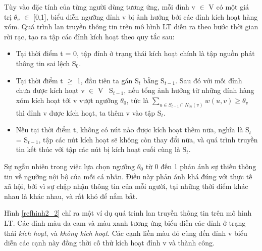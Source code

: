 	Tùy vào đặc tính của từng người dùng tương ứng, mỗi đỉnh v $\in$ V có một giá trị $\theta$$_{v}$ $\in$ [0,1], biểu diễn ngưỡng đỉnh v bị ảnh hưởng bởi các đỉnh kích hoạt hàng xóm. Quá trình lan truyền thông tin trên mô hình LT diễn ra theo bước thời gian rời rạc, tạo ra tập các đỉnh kích hoạt theo quy tắc sau:
	\begin {itemize}
		\item Tại thời điểm t = 0, tập đỉnh ở trạng thái kích hoạt chính là tập nguồn phát thông tin sai lệch S$_{0}$.
	
		\item Tại thời điểm t $\geq$ 1, đầu tiên ta gán S$_{t}$ bằng S$_{t-1}$. Sau đó với mỗi đỉnh chưa được kích hoạt v $\in$ V \ S$_{t-1}$, nếu tổng ảnh hưởng từ những đính hàng xóm kích hoạt tới v vượt ngưỡng $\theta$$_{0}$, tức là  $\sum_{u\in S_{t-1} \cap N_{in}(v)}w(u,v) \geq \theta_{v}$ thì đỉnh v được kích hoạt, ta thêm v vào tập S$_{t}$.
	
		\item Nếu tại thời điểm t, không có nút nào được kích hoạt thêm nữa, nghĩa là S$_{t}$ = S$_{t-1}$, tập các nút kích hoạt sẽ không còn thay đổi nữa, và quá trình truyền tin kết thúc với tập các nút bị kích hoạt cuối cùng là S$_{t}$.
	\end {itemize}
	Sự ngẫu nhiên trong việc lựa chọn ngưỡng $\theta$$_{0}$ từ 0 đến 1 phản ánh sự thiếu thông tin về ngưỡng nội bộ của mỗi cá nhân. Điều này phản ánh khá đúng với thực tế xã hội, bởi vì sự chập nhận thông tin của mỗi người, tại những thời điểm khác nhau là khác nhau, và rất khó để nắm bắt. 
	
	Hình \ref{refhinh2_2} chỉ ra một ví dụ quá trình lan truyền thông tin trên mô hình LT. Các đỉnh màu da cam và màu xanh tương ứng biểu diễn các đỉnh ở trạng thái {\itshape kích hoạt}, và {\itshape không kích hoạt}. Các cạnh liền màu đỏ cùng đến đỉnh v biểu diễn các cạnh này đồng thời cố thử kích hoạt đỉnh v và thành công.
	
